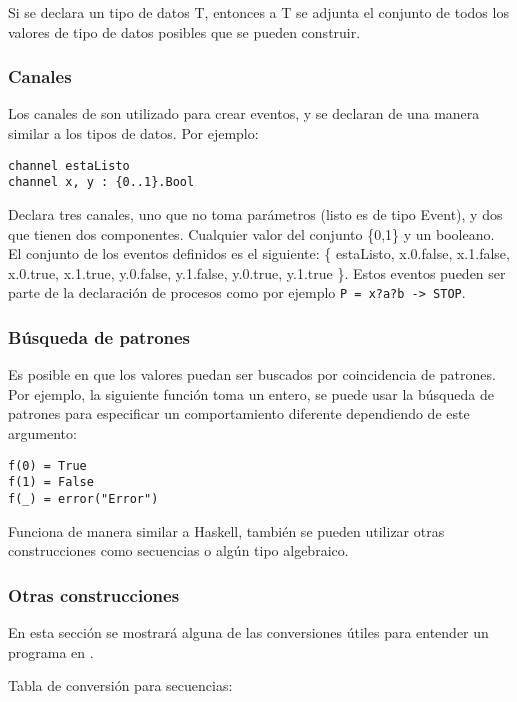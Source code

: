 Si se declara un tipo de datos T, entonces a T se adjunta el conjunto de todos los valores de tipo de datos posibles que se pueden construir. 

\subsubsection{Canales}

Los canales de \CSPm son utilizado para crear eventos, y se declaran de una manera similar a los tipos de datos. Por ejemplo:

\begin{lstlisting}[language=cspm, style=sinnumeros]
channel estaListo
channel x, y : {0..1}.Bool
\end{lstlisting}

Declara tres canales, uno que no toma parámetros (listo es de tipo Event), y dos que tienen dos componentes. Cualquier valor del conjunto \{0,1\} y un booleano. El conjunto de los eventos definidos es el siguiente: \{ estaListo, x.0.false, x.1.false, x.0.true, x.1.true, y.0.false, y.1.false, y.0.true, y.1.true \}. Estos eventos pueden ser parte de la declaración de procesos como por ejemplo \lstinline[language=cspm, style=sinnumeros]{P = x?a?b -> STOP}.

\subsubsection{Búsqueda de patrones}

Es posible en \CSP que los valores puedan ser buscados por coincidencia de patrones. Por ejemplo, la siguiente función toma un entero, se puede usar la búsqueda de patrones para especificar un comportamiento diferente dependiendo de este argumento:

\begin{lstlisting}[language=cspm, style=sinnumeros]
f(0) = True
f(1) = False
f(_) = error("Error")
\end{lstlisting}

Funciona de manera similar a Haskell, también se pueden utilizar otras construcciones como secuencias o algún tipo algebraico.

\subsubsection{Otras construcciones}
En esta sección se mostrará alguna de las conversiones útiles para entender un programa en \CSPm.

Tabla de conversión para secuencias:


